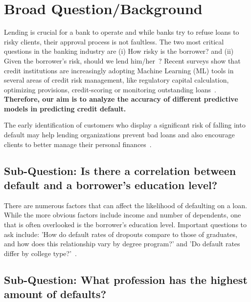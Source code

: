 \author[1]{Tom O'Connell}
\author[2]{Thomas Birkner}
\author[3]{Theyab Alrashdi}


\date{}



\maketitle

\section{Broad Question/Background}

Lending is crucial for a bank to operate and while banks try to refuse loans to risky clients, their approval process is not faultless. The two most critical questions in the banking industry are (i) How risky is the borrower? and (ii) Given the borrower's risk, should we lend him/her~\cite{madaan2021loan}? Recent surveys show that credit institutions are increasingly adopting Machine Learning (ML) tools in several areas of credit risk management, like regulatory capital calculation, optimizing provisions, credit-scoring or monitoring outstanding loans~\cite{alonso2021understanding}. \textbf{Therefore, our aim is to analyze the accuracy of different predictive models in predicting  credit default.} 
 
The early identification of customers who display a significant risk of falling into default may help lending organizations prevent bad loans and also encourage clients to better manage their personal finances~\cite{cocser2019predictive}.


\subsection{Sub-Question: Is there a correlation between default and a borrower's education level?}

There are numerous factors that can affect the likelihood of defaulting on a loan. While the more obvious factors include income and number of dependents, one that is often overlooked is the borrower's education level. Important questions to ask include: 'How do default rates of dropouts compare to those of graduates, and how does this relationship vary by degree program?' and 'Do default rates differ by college type?'~\cite{chakrabarti2017more}.


\subsection{Sub-Question: What profession has the highest amount of defaults?}

